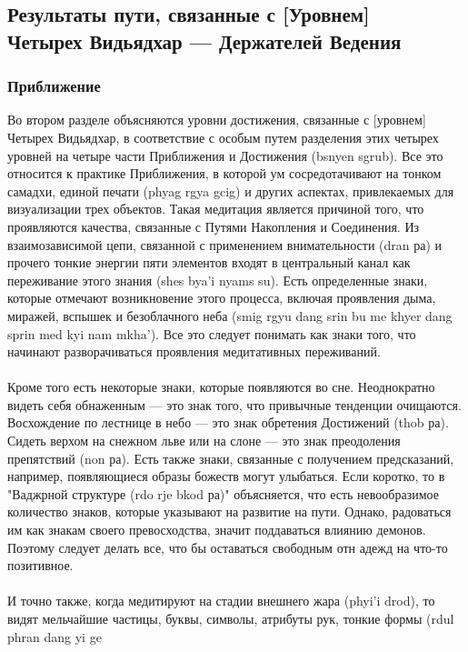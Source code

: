 \subsection{Результаты пути, связанные с [Уровнем] \\ Четырех Видьядхар — Держателей Ведения}

\subsubsection{Приближение}

Во втором разделе объясняются уровни достижения, связанные с [уровнем] Четырех
Видьядхар, в соответствие с особым путем разделения этих четырех уровней на четыре части
Приближения и Достижения (bsnyen sgrub). Все это относится к практике Приближения, в
которой ум сосредотачивают на тонком самадхи, единой печати (phyag rgya gcig) и других
аспектах, привлекаемых для визуализации трех объектов. Такая медитация является
причиной того, что проявляются качества, связанные с Путями Накопления и Соединения.
Из взаимозависимой цепи, связанной с применением внимательности (dran ра) и прочего
тонкие энергии пяти элементов входят в центральный канал как переживание этого знания
(shes bya'i nyams su). Есть определенные знаки, которые отмечают возникновение этого
процесса, включая проявления дыма, миражей, вспышек и безоблачного неба (smig rgyu dang
srin bu me khyer dang sprin med kyi nam mkha'). Все это следует понимать как знаки того, что
начинают разворачиваться проявления медитативных переживаний.\\
\\
Кроме того есть некоторые знаки, которые появляются во сне. Неоднократно видеть
себя обнаженным — это знак того, что привычные тенденции очищаются. Восхождение по
лестнице в небо — это знак обретения Достижений (thob ра). Сидеть верхом на снежном льве
или на слоне — это знак преодоления препятствий (non ра). Есть также знаки, связанные с
получением предсказаний, например, появляющиеся образы божеств могут улыбаться. Если
коротко, то в "Ваджрной структуре (rdo rje bkod ра)" объясняется, что есть невообразимое
количество знаков, которые указывают на развитие на пути. Однако, радоваться им как
знакам своего превосходства, значит поддаваться влиянию демонов. Поэтому следует делать
все, что бы оставаться свободным отн адежд на что-то позитивное.\\
\\
И точно также, когда медитируют на стадии внешнего жара (phyi'i drod), то видят
мельчайшие частицы, буквы, символы, атрибуты рук, тонкие формы (rdul phran dang yi ge
